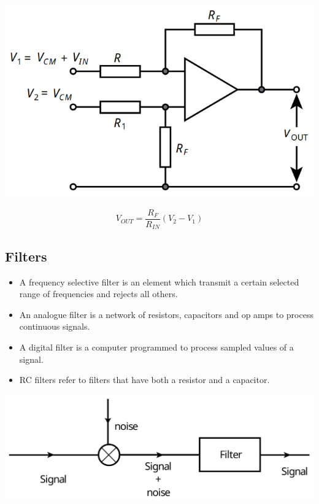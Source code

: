 \documentclass[11pt]{article}
\begin{document}
\begin{center}
\includegraphics[scale=0.8]{./images/differential-amplifier-alt.png}
\end{center}
\[V_{OUT} = \frac{R_F}{R_{IN}} \left(V_2 - V_1 \right)\]

\subsection{Filters}
\label{sec:orgf81e8a2}
\begin{itemize}
\item A frequency selective filter is an element which transmit a certain selected range of frequencies and rejects all others.
\item An analogue filter is a network of resistors, capacitors and op amps to process continuous signals.
\item A digital filter is a computer programmed to process sampled values of a signal.
\item RC filters refer to filters that have both a resistor and a capacitor.
\end{itemize}

\begin{center}
\includegraphics[width=.9\linewidth]{./images/filtering-image.png}
\end{center}
\end{document}
